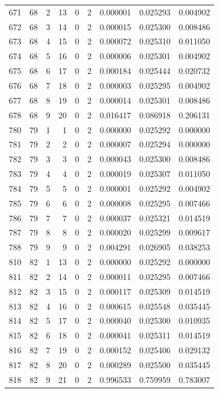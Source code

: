 \begin{longtable}{rrrrrrrrr}
671 & 68 & 2 & 13 & 0 & 2 & 0.000001 & 0.025293 & 0.004902 \\
672 & 68 & 3 & 14 & 0 & 2 & 0.000015 & 0.025300 & 0.008486 \\
673 & 68 & 4 & 15 & 0 & 2 & 0.000072 & 0.025310 & 0.011050 \\
674 & 68 & 5 & 16 & 0 & 2 & 0.000006 & 0.025301 & 0.004902 \\
675 & 68 & 6 & 17 & 0 & 2 & 0.000184 & 0.025444 & 0.020732 \\
676 & 68 & 7 & 18 & 0 & 2 & 0.000003 & 0.025295 & 0.004902 \\
677 & 68 & 8 & 19 & 0 & 2 & 0.000014 & 0.025301 & 0.008486 \\
678 & 68 & 9 & 20 & 0 & 2 & 0.016417 & 0.086918 & 0.206131 \\
780 & 79 & 1 & 1 & 0 & 2 & 0.000000 & 0.025292 & 0.000000 \\
781 & 79 & 2 & 2 & 0 & 2 & 0.000007 & 0.025294 & 0.000000 \\
782 & 79 & 3 & 3 & 0 & 2 & 0.000043 & 0.025300 & 0.008486 \\
783 & 79 & 4 & 4 & 0 & 2 & 0.000019 & 0.025307 & 0.011050 \\
784 & 79 & 5 & 5 & 0 & 2 & 0.000001 & 0.025292 & 0.004902 \\
785 & 79 & 6 & 6 & 0 & 2 & 0.000008 & 0.025295 & 0.007466 \\
786 & 79 & 7 & 7 & 0 & 2 & 0.000037 & 0.025321 & 0.014519 \\
787 & 79 & 8 & 8 & 0 & 2 & 0.000020 & 0.025299 & 0.009617 \\
788 & 79 & 9 & 9 & 0 & 2 & 0.004291 & 0.026905 & 0.038253 \\
810 & 82 & 1 & 13 & 0 & 2 & 0.000000 & 0.025292 & 0.000000 \\
811 & 82 & 2 & 14 & 0 & 2 & 0.000011 & 0.025295 & 0.007466 \\
812 & 82 & 3 & 15 & 0 & 2 & 0.000117 & 0.025309 & 0.014519 \\
813 & 82 & 4 & 16 & 0 & 2 & 0.000615 & 0.025548 & 0.035445 \\
814 & 82 & 5 & 17 & 0 & 2 & 0.000040 & 0.025300 & 0.010935 \\
815 & 82 & 6 & 18 & 0 & 2 & 0.000041 & 0.025311 & 0.014519 \\
816 & 82 & 7 & 19 & 0 & 2 & 0.000152 & 0.025406 & 0.029132 \\
817 & 82 & 8 & 20 & 0 & 2 & 0.000289 & 0.025500 & 0.035445 \\
818 & 82 & 9 & 21 & 0 & 2 & 0.996533 & 0.759959 & 0.783007 \\

\end{longtable}
